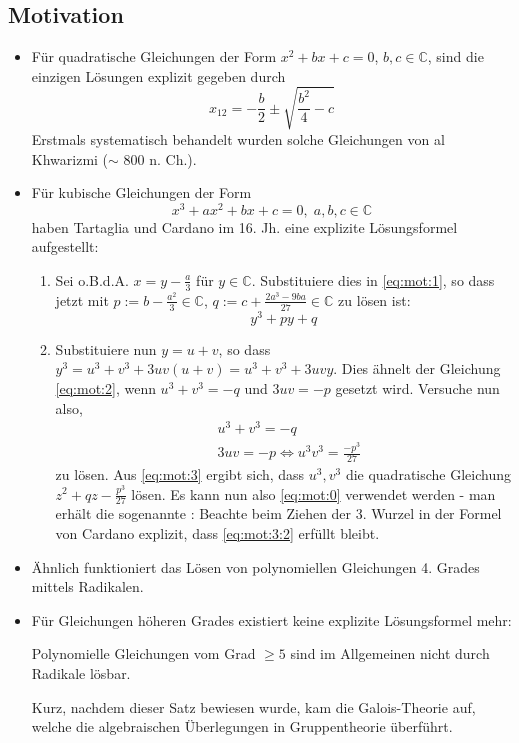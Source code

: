 \documentclass[../main.tex]{subfiles}
\begin{document}
\subsection{Motivation}\label{sec:mot}
\TODO
\begin{itemize}
    \item Für quadratische Gleichungen der Form $x^2 + bx + c = 0$, $b, c \in \mathbb{C}$, sind die einzigen Lösungen explizit gegeben durch 
    \begin{equation}\label{eq:mot:0}
        x_{12} = -\frac{b}{2} \pm \sqrt{\frac{b^2}{4} - c}
    \end{equation} 
    Erstmals systematisch behandelt wurden solche Gleichungen von al Khwarizmi ($\sim$ 800 n. Ch.).
    \item Für kubische Gleichungen der Form
    \begin{equation}\label{eq:mot:1}
        x^3 + ax^2 + bx + c = 0, \; a, b, c \in \mathbb{C}
    \end{equation}
    haben Tartaglia und Cardano im 16. Jh. eine explizite Lösungsformel aufgestellt:
    \begin{enumerate}
        \item Sei o.B.d.A. $x = y - \frac{a}{3}$ für $y \in \mathbb{C}$. Substituiere dies in \cref{eq:mot:1}, so dass jetzt mit $p := b - \frac{a^2}{3} \in \mathbb{C}$, $q := c + \frac{2a^3 - 9ba}{27} \in \mathbb{C}$ zu lösen ist:
        \begin{equation}\label{eq:mot:2}
            y^3 + py + q
        \end{equation}
        \item Substituiere nun $y = u + v$, so dass $y^3 = u^3 + v^3 + 3uv(u+v) = u^3 + v^3 + 3uv y$.
        Dies ähnelt der Gleichung \cref{eq:mot:2}, wenn $u^3 + v^3 = -q$ und $3uv = -p$ gesetzt wird. Versuche nun also, 
            \begin{align}\label{eq:mot:3}
                &u^3 + v^3 = -q \\
                &3uv = -p \Leftrightarrow u^3v^3 = \frac{-p^3}{27}\label{eq:mot:3:2}
            \end{align}
        zu lösen.
        Aus \cref{eq:mot:3} ergibt sich, dass $u^3, v^3$ die quadratische Gleichung $z^2 + qz - \frac{p^3}{27}$ lösen. Es kann nun also \cref{eq:mot:0} verwendet werden - man erhält die sogenannte :
        Beachte beim Ziehen der 3. Wurzel in der Formel von Cardano explizit, dass \cref{eq:mot:3:2} erfüllt bleibt.
    \end{enumerate}
    \item Ähnlich funktioniert das Lösen von polynomiellen Gleichungen 4. Grades mittels Radikalen.
    \item Für Gleichungen höheren Grades existiert keine explizite Lösungsformel mehr: 
    \begin{theorem}
        Polynomielle Gleichungen vom Grad $\geq 5$ sind im Allgemeinen nicht durch Radikale lösbar.
    \end{theorem}
    Kurz, nachdem dieser Satz bewiesen wurde, kam die Galois-Theorie auf, welche die algebraischen Überlegungen in Gruppentheorie überführt.
\end{itemize}
\end{document}
